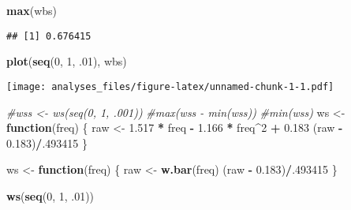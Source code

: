\documentclass[]{article}
\newenvironment{Shaded}{\begin{snugshade}}{\end{snugshade}}
\newcommand{\KeywordTok}[1]{\textcolor[rgb]{0.13,0.29,0.53}{\textbf{#1}}}
\newcommand{\DecValTok}[1]{\textcolor[rgb]{0.00,0.00,0.81}{#1}}
\newcommand{\FloatTok}[1]{\textcolor[rgb]{0.00,0.00,0.81}{#1}}
\newcommand{\StringTok}[1]{\textcolor[rgb]{0.31,0.60,0.02}{#1}}
\newcommand{\CommentTok}[1]{\textcolor[rgb]{0.56,0.35,0.01}{\textit{#1}}}
\newcommand{\ControlFlowTok}[1]{\textcolor[rgb]{0.13,0.29,0.53}{\textbf{#1}}}
\newcommand{\OperatorTok}[1]{\textcolor[rgb]{0.81,0.36,0.00}{\textbf{#1}}}
\newcommand{\NormalTok}[1]{#1}
\begin{document}
\begin{Shaded}
\begin{Highlighting}[]
\KeywordTok{max}\NormalTok{(wbs)}
\end{Highlighting}
\end{Shaded}

\begin{verbatim}
## [1] 0.676415
\end{verbatim}

\begin{Shaded}
\begin{Highlighting}[]
\KeywordTok{plot}\NormalTok{(}\KeywordTok{seq}\NormalTok{(}\DecValTok{0}\NormalTok{, }\DecValTok{1}\NormalTok{, .}\DecValTok{01}\NormalTok{), wbs)}
\end{Highlighting}
\end{Shaded}

\texttt{[image: analyses\_files/figure-latex/unnamed-chunk-1-1.pdf]}

\begin{Shaded}
\begin{Highlighting}[]
\CommentTok{#wss <- ws(seq(0, 1, .001))}
\CommentTok{#max(wss - min(wss))}
\CommentTok{#min(wss)}
\NormalTok{ws <-}\StringTok{ }\ControlFlowTok{function}\NormalTok{(freq) \{}
\NormalTok{  raw <-}\StringTok{ }\FloatTok{1.517} \OperatorTok{*}\StringTok{ }\NormalTok{freq }\OperatorTok{-}\StringTok{ }\FloatTok{1.166} \OperatorTok{*}\StringTok{ }\NormalTok{freq}\OperatorTok{^}\DecValTok{2} \OperatorTok{+}\StringTok{ }\FloatTok{0.183}
\NormalTok{  (raw }\OperatorTok{-}\StringTok{ }\FloatTok{0.183}\NormalTok{)}\OperatorTok{/}\NormalTok{.}\DecValTok{493415}
\NormalTok{  \}}

\NormalTok{ws <-}\StringTok{ }\ControlFlowTok{function}\NormalTok{(freq) \{}
\NormalTok{  raw <-}\StringTok{ }\KeywordTok{w.bar}\NormalTok{(freq)}
\NormalTok{  (raw }\OperatorTok{-}\StringTok{ }\FloatTok{0.183}\NormalTok{)}\OperatorTok{/}\NormalTok{.}\DecValTok{493415}
\NormalTok{  \}}

\KeywordTok{ws}\NormalTok{(}\KeywordTok{seq}\NormalTok{(}\DecValTok{0}\NormalTok{, }\DecValTok{1}\NormalTok{, .}\DecValTok{01}\NormalTok{))}
\end{Highlighting}
\end{Shaded}
\end{document}
